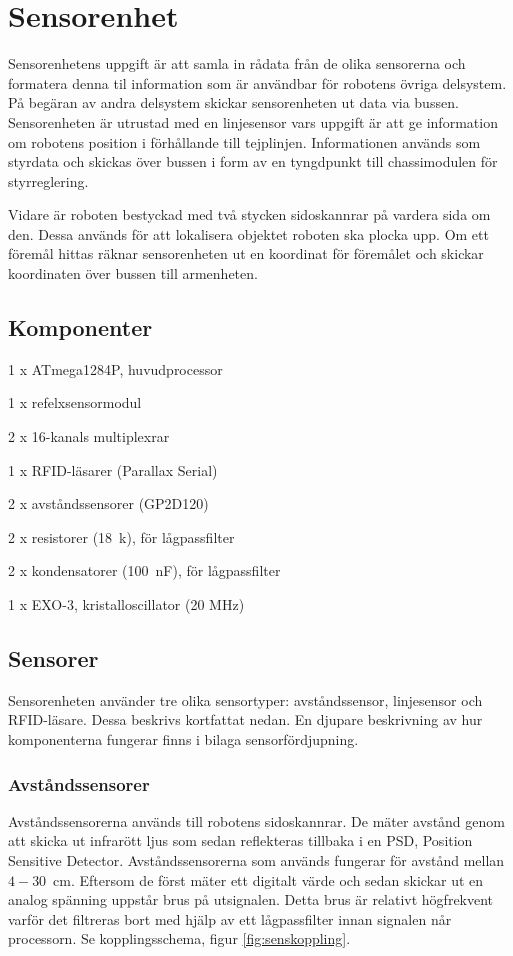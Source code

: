 \section{Sensorenhet}
Sensorenhetens uppgift är att samla in rådata från de olika sensorerna och formatera denna til information som är användbar för robotens övriga delsystem. På begäran av andra delsystem skickar sensorenheten ut data via bussen. Sensorenheten är utrustad
med en linjesensor vars uppgift är att ge information om robotens position i förhållande till tejplinjen. Informationen används som styrdata och skickas över bussen i form av en tyngdpunkt till chassimodulen för styrreglering.

Vidare är roboten bestyckad med två stycken sidoskannrar på vardera sida om den. Dessa används för att lokalisera objektet roboten ska plocka upp. Om ett föremål hittas räknar sensorenheten ut en koordinat för föremålet och skickar koordinaten över bussen till armenheten.


\subsection{Komponenter}
\begin{packed_itemize}
\item 1 x ATmega1284P, huvudprocessor
\item 1 x refelxsensormodul
\item 2 x 16-kanals multiplexrar
\item 1 x RFID-läsarer (Parallax Serial)
\item 2 x avståndssensorer (GP2D120)
\item 2 x resistorer (18~k\ohm), för lågpassfilter
\item 2 x kondensatorer (100~nF), för lågpassfilter
\item 1 x EXO-3, kristalloscillator (20 MHz)
\end{packed_itemize}

\subsection{Sensorer}
Sensorenheten använder tre olika sensortyper: avståndssensor, linjesensor och RFID-läsare.
Dessa beskrivs kortfattat nedan. En djupare beskrivning av hur komponenterna fungerar finns i bilaga sensorfördjupning.

\subsubsection{Avståndssensorer}
Avståndssensorerna används till robotens sidoskannrar. De mäter avstånd genom att skicka ut infrarött ljus som sedan reflekteras tillbaka i en PSD, Position Sensitive Detector. Avståndssensorerna som används fungerar för avstånd mellan \mbox{$4-30$ cm}. Eftersom de först mäter ett digitalt värde och sedan skickar ut en analog spänning uppstår brus på utsignalen. Detta brus är relativt högfrekvent varför det filtreras bort med hjälp av ett lågpassfilter innan signalen når processorn. Se kopplingsschema, figur \ref{fig:senskoppling}.


